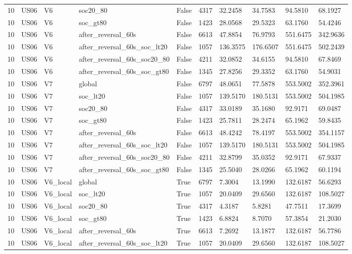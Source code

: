 \begin{tabular}{llllllllll}
10 & US06 & V6 & soc20\_80 & False & 4317 & 32.2458 & 34.7583 & 94.5810 & 68.1927 \\
10 & US06 & V6 & soc\_gt80 & False & 1423 & 28.0568 & 29.5323 & 63.1760 & 54.4246 \\
10 & US06 & V6 & after\_reversal\_60s & False & 6613 & 47.8854 & 76.9793 & 551.6475 & 342.9636 \\
10 & US06 & V6 & after\_reversal\_60s\_soc\_lt20 & False & 1057 & 136.3575 & 176.6507 & 551.6475 & 502.2439 \\
10 & US06 & V6 & after\_reversal\_60s\_soc20\_80 & False & 4211 & 32.0852 & 34.6155 & 94.5810 & 67.8469 \\
10 & US06 & V6 & after\_reversal\_60s\_soc\_gt80 & False & 1345 & 27.8256 & 29.3352 & 63.1760 & 54.9031 \\
10 & US06 & V7 & global & False & 6797 & 48.0651 & 77.5878 & 553.5002 & 352.3961 \\
10 & US06 & V7 & soc\_lt20 & False & 1057 & 139.5170 & 180.5131 & 553.5002 & 504.1985 \\
10 & US06 & V7 & soc20\_80 & False & 4317 & 33.0189 & 35.1680 & 92.9171 & 69.0487 \\
10 & US06 & V7 & soc\_gt80 & False & 1423 & 25.7811 & 28.2474 & 65.1962 & 59.8435 \\
10 & US06 & V7 & after\_reversal\_60s & False & 6613 & 48.4242 & 78.4197 & 553.5002 & 354.1157 \\
10 & US06 & V7 & after\_reversal\_60s\_soc\_lt20 & False & 1057 & 139.5170 & 180.5131 & 553.5002 & 504.1985 \\
10 & US06 & V7 & after\_reversal\_60s\_soc20\_80 & False & 4211 & 32.8799 & 35.0352 & 92.9171 & 67.9337 \\
10 & US06 & V7 & after\_reversal\_60s\_soc\_gt80 & False & 1345 & 25.5040 & 28.0266 & 65.1962 & 60.1194 \\
10 & US06 & V6\_local & global & True & 6797 & 7.3004 & 13.1990 & 132.6187 & 56.6293 \\
10 & US06 & V6\_local & soc\_lt20 & True & 1057 & 20.0409 & 29.6560 & 132.6187 & 108.5027 \\
10 & US06 & V6\_local & soc20\_80 & True & 4317 & 4.3187 & 5.8281 & 47.7511 & 17.3699 \\
10 & US06 & V6\_local & soc\_gt80 & True & 1423 & 6.8824 & 8.7070 & 57.3854 & 21.2030 \\
10 & US06 & V6\_local & after\_reversal\_60s & True & 6613 & 7.2692 & 13.1877 & 132.6187 & 56.7786 \\
10 & US06 & V6\_local & after\_reversal\_60s\_soc\_lt20 & True & 1057 & 20.0409 & 29.6560 & 132.6187 & 108.5027 \\

\end{tabular}

